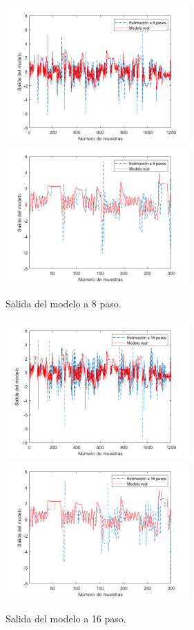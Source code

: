 \documentclass[12pt]{article}
\begin{document}
\begin{figure}
\centering
\caption{Salida del modelo a 8 paso.}
\includegraphics[width=7cm]{imag/P1Salida_p8}
\includegraphics[width=7cm]{imag/P1Salida_p8Zoom}
\label{f_SalidaModelop8}
\end{figure}

\begin{figure}
\centering
\caption{Salida del modelo a 16 paso.}
\includegraphics[width=7cm]{imag/P1Salida_p16}
\includegraphics[width=7cm]{imag/P1Salida_p16Zoom}
\label{f_SalidaModelop16}
\end{figure}
\end{document}
